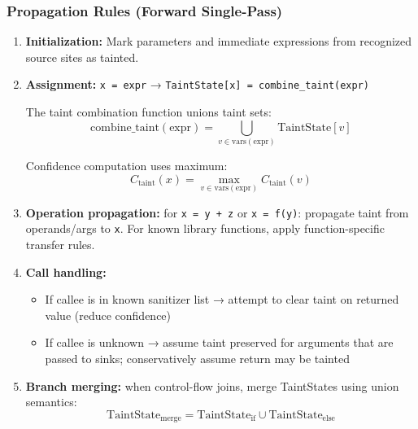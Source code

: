 \subsubsection{Propagation Rules (Forward Single-Pass)}

\begin{enumerate}
    \item \textbf{Initialization:} Mark parameters and immediate expressions from recognized source sites as tainted.

    \item \textbf{Assignment:} \texttt{x = expr} → \texttt{TaintState[x] = combine\_taint(expr)}

    The taint combination function unions taint sets:
    \begin{equation}
    \text{combine\_taint}(\text{expr}) = \bigcup_{v \in \text{vars}(\text{expr})} \text{TaintState}[v]
    \label{eq:taint_combine}
    \end{equation}

    Confidence computation uses maximum:
    \begin{equation}
    C_{\text{taint}}(x) = \max_{v \in \text{vars}(\text{expr})} C_{\text{taint}}(v)
    \label{eq:taint_confidence}
    \end{equation}

    \item \textbf{Operation propagation:} for \texttt{x = y + z} or \texttt{x = f(y)}: propagate taint from operands/args to \texttt{x}. For known library functions, apply function-specific transfer rules.

    \item \textbf{Call handling:}
    \begin{itemize}
        \item If callee is in known sanitizer list → attempt to clear taint on returned value (reduce confidence)
        \item If callee is unknown → assume taint preserved for arguments that are passed to sinks; conservatively assume return may be tainted
    \end{itemize}

    \item \textbf{Branch merging:} when control-flow joins, merge TaintStates using union semantics:
    \begin{equation}
    \text{TaintState}_{\text{merge}} = \text{TaintState}_{\text{if}} \cup \text{TaintState}_{\text{else}}
    \label{eq:state_merge}
    \end{equation}


\end{enumerate}
